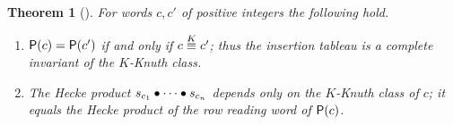 \documentclass{amsart}
\newtheorem{theorem}[lemma]{Theorem}
\theoremstyle{definition}
\newtheorem{definition}[lemma]{Definition}
\theoremstyle{remark}
\numberwithin{equation}{subsection}
\begin{document}




\begin{theorem}[\cite{buch2008factorsequences,buch2016minuscule}]
\label{theorem:kknuth-invariant}
For words $c,c'$ of positive integers the following hold.
\begin{enumerate}
\item $\mathsf{P}(c)=\mathsf{P}(c')$ if and only if $c\overset{K}{\equiv} c'$; thus the insertion tableau is a
complete invariant of the $K$-Knuth class.
\item The Hecke product $s_{c_1}\bullet\cdots\bullet s_{c_n}$ depends only on the
$K$-Knuth class of $c$; it equals the Hecke product of the row reading word of
$\mathsf{P}(c)$.
\end{enumerate}
\end{theorem}
\end{document}
